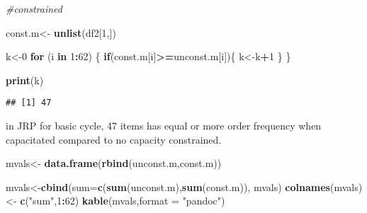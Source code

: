 \documentclass[
]{article}
\newenvironment{Shaded}{\begin{snugshade}}{\end{snugshade}}
\newcommand{\CommentTok}[1]{\textcolor[rgb]{0.56,0.35,0.01}{\textit{#1}}}
\newcommand{\ControlFlowTok}[1]{\textcolor[rgb]{0.13,0.29,0.53}{\textbf{#1}}}
\newcommand{\DataTypeTok}[1]{\textcolor[rgb]{0.13,0.29,0.53}{#1}}
\newcommand{\DecValTok}[1]{\textcolor[rgb]{0.00,0.00,0.81}{#1}}
\newcommand{\KeywordTok}[1]{\textcolor[rgb]{0.13,0.29,0.53}{\textbf{#1}}}
\newcommand{\NormalTok}[1]{#1}
\newcommand{\OperatorTok}[1]{\textcolor[rgb]{0.81,0.36,0.00}{\textbf{#1}}}
\newcommand{\StringTok}[1]{\textcolor[rgb]{0.31,0.60,0.02}{#1}}
\begin{document}
\begin{Shaded}
\begin{Highlighting}[]
\CommentTok{#constrained}

\NormalTok{const.m<-}\StringTok{ }\KeywordTok{unlist}\NormalTok{(df2[}\DecValTok{1}\NormalTok{,])}

\NormalTok{k<-}\DecValTok{0}
\ControlFlowTok{for}\NormalTok{ (i }\ControlFlowTok{in} \DecValTok{1}\OperatorTok{:}\DecValTok{62}\NormalTok{) \{}
  \ControlFlowTok{if}\NormalTok{(const.m[i]}\OperatorTok{>=}\NormalTok{unconst.m[i])\{}
\NormalTok{    k<-k}\OperatorTok{+}\DecValTok{1}
\NormalTok{  \}}
\NormalTok{\}}

\KeywordTok{print}\NormalTok{(k)}
\end{Highlighting}
\end{Shaded}

\begin{verbatim}
## [1] 47
\end{verbatim}

in JRP for basic cycle, 47 items has equal or more order frequency when
capacitated compared to no capacity constrained.

\begin{Shaded}
\begin{Highlighting}[]
\NormalTok{mvals<-}\StringTok{ }\KeywordTok{data.frame}\NormalTok{(}\KeywordTok{rbind}\NormalTok{(unconst.m,const.m))}

\NormalTok{mvals<-}\KeywordTok{cbind}\NormalTok{(}\DataTypeTok{sum=}\KeywordTok{c}\NormalTok{(}\KeywordTok{sum}\NormalTok{(unconst.m),}\KeywordTok{sum}\NormalTok{(const.m)), mvals)}
\KeywordTok{colnames}\NormalTok{(mvals)<-}\StringTok{ }\KeywordTok{c}\NormalTok{(}\StringTok{"sum"}\NormalTok{,}\DecValTok{1}\OperatorTok{:}\DecValTok{62}\NormalTok{)}
\KeywordTok{kable}\NormalTok{(mvals,}\DataTypeTok{format =} \StringTok{"pandoc"}\NormalTok{)}
\end{Highlighting}
\end{Shaded}
\end{document}
